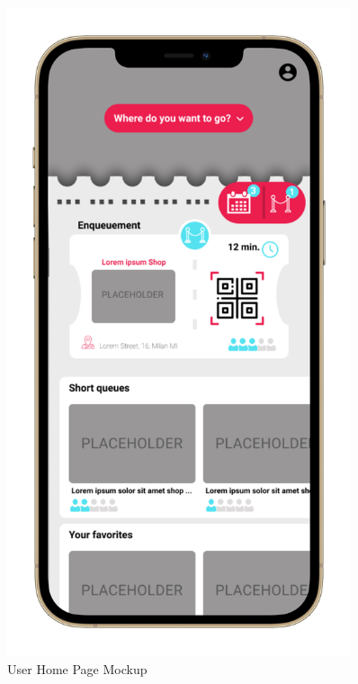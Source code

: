 \begin{figure}
\begin{minipage}{.45\linewidth}
    \includegraphics[width=0.9\textwidth]{Images/UserInterfaces/withiphonephrames/HomePage_iphone12promaxgold_portrait.png}
    \caption{\label{fig:InterfacesDiagram}{User Home Page Mockup}}
\end{minipage}
\end{figure}

